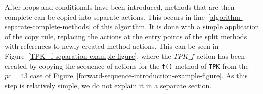 After loops and conditionals have been introduced, methods that are
then complete can be copied into separate actions.
This occurs in line~\ref{algorithm-separate-complete-methods} of this
algorithm.
It is done with a simple application of the copy rule, replacing the
actions at the entry points of the split methods with references to
newly created method actions.
This can be seen in Figure~\ref{TPK_f-separation-example-figure},
where the $TPK\_f$ action has been created by copying the sequence of
actions for the \texttt{f()} method of \texttt{TPK} from the $pc = 43$
case of Figure~\ref{forward-sequence-introduction-example-figure}.
As this step is relatively simple, we do not explain it in a separate
section.
\begin{figure}[tp!]
  \setlength{\zedindent}{0cm}
  \setlength{\zedtab}{0.3cm}
  \setlength{\zedleftsep}{0cm}
  \setlength{\abovedisplayskip}{0cm}
  \setlength{\belowdisplayskip}{0cm}
\end{figure}

